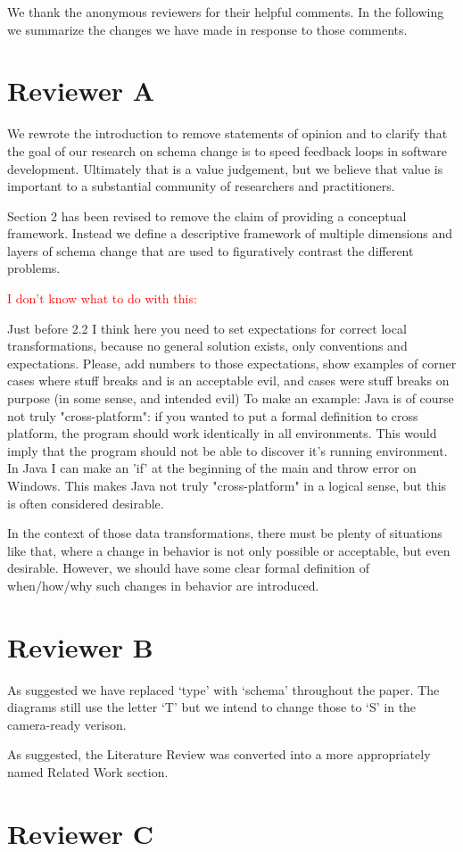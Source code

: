 \documentclass{article}
\begin{document}
We thank the anonymous reviewers for their helpful comments. In the following we summarize the changes we have made in response to those comments.

\section{Reviewer A}

We rewrote the introduction to remove statements of opinion and to clarify that the goal of our research on schema change is to speed feedback loops in software development. Ultimately that is a value judgement, but we believe that value is important to a substantial community of researchers and practitioners.

Section 2 has been revised to remove the claim of providing a conceptual framework. Instead we define a descriptive framework of multiple dimensions and layers of schema change that are used to figuratively contrast the different problems.

\textcolor{red}{I don't know what to do with this:}
\begin{displayquote}
  Just before 2.2 I think here you need to set expectations for correct local transformations, because no general solution exists, only conventions and expectations. Please, add numbers to those expectations, show examples of corner cases where stuff breaks and is an acceptable evil, and cases were stuff breaks on purpose (in some sense, and intended evil) To make an example: Java is of course not truly "cross-platform": if you wanted to put a formal definition to cross platform, the program should work identically in all environments. This would imply that the program should not be able to discover it's running environment. In Java I can make an 'if' at the beginning of the main and throw error on Windows. This makes Java not truly "cross-platform" in a logical sense, but this is often considered desirable.

  In the context of those data transformations, there must be plenty of situations like that, where a change in behavior is not only possible or acceptable, but even desirable. However, we should have some clear formal definition of when/how/why such changes in behavior are introduced.
\end{displayquote}


\section{Reviewer B}

As suggested we have replaced `type' with `schema' throughout the paper. The diagrams still use the letter `T' but we intend to change those to `S' in the camera-ready verison.

As suggested, the Literature Review was converted into a more appropriately named Related Work section.


\section{Reviewer C}
\end{document}
